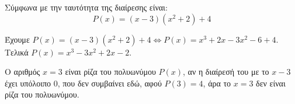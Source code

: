 \begin{alist}
\item Σύμφωνα με την ταυτότητα της διαίρεσης είναι:
\[P(x) = (x - 3)(x^2 + 2) + 4\]
\item Έχουμε $P(x) = (x - 3)(x^2 + 2) + 4 \Leftrightarrow P(x) = x^3 + 2x - 3x^2 - 6 + 4$.
Τελικά $P(x) = x^3 - 3x^2 + 2x - 2$.
\item Ο αριθμός $x = 3$ είναι ρίζα του πολυωνύμου $P(x)$, αν η διαίρεσή του με το $x - 3$ έχει υπόλοιπο $0$, που δεν συμβαίνει εδώ, αφού $P(3) = 4$, άρα το $x = 3$ δεν είναι ρίζα του πολυωνύμου.
\end{alist}

